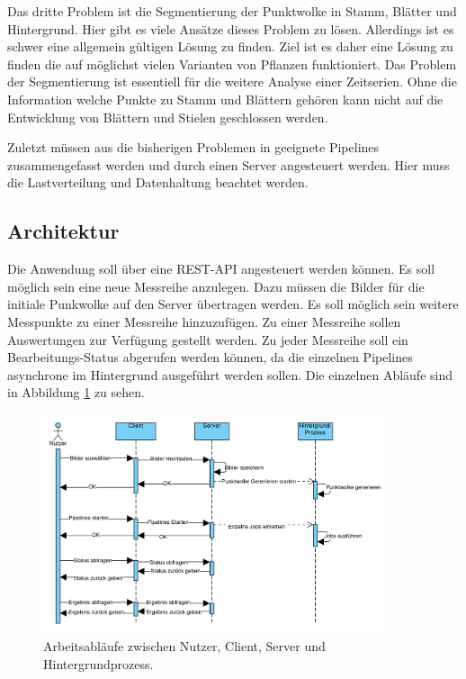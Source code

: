 \documentclass[12pt,titlepage, twoside]{article}
\begin{document}

Das dritte Problem ist die Segmentierung der Punktwolke in Stamm, Blätter und Hintergrund. Hier gibt es viele Ansätze dieses Problem zu lösen. Allerdings ist es schwer eine allgemein gültigen Lösung zu finden. 
Ziel ist es daher eine Lösung zu finden die auf möglichst vielen Varianten von Pflanzen funktioniert. 
Das Problem der Segmentierung ist essentiell für die weitere Analyse einer Zeitserien. Ohne die Information welche Punkte zu Stamm und Blättern gehören kann nicht auf die Entwicklung von Blättern und Stielen geschlossen werden.

Zuletzt müssen aus die bisherigen Problemen in geeignete Pipelines zusammengefasst werden und durch einen Server angesteuert werden. Hier muss die Lastverteilung und Datenhaltung beachtet werden.

\subsection{Architektur}
\label{sec:realisierung:architektur}

Die Anwendung soll über eine REST-API angesteuert werden können. Es soll möglich sein eine neue Messreihe anzulegen. Dazu müssen die Bilder für die initiale Punkwolke auf den Server übertragen werden. 
Es soll möglich sein weitere Messpunkte zu einer Messreihe hinzuzufügen. Zu einer Messreihe sollen Auswertungen zur Verfügung gestellt werden. 
Zu jeder Messreihe soll ein Bearbeitungs-Status abgerufen werden können, da die einzelnen Pipelines asynchrone im Hintergrund ausgeführt werden sollen.
Die einzelnen Abläufe sind in Abbildung \ref{fig:WorkflowClientServer} zu sehen.

\begin{figure}
    \centering
    \includegraphics[width=0.9\textwidth]{./Images/WorkflowClientServer.png}
    \caption{Arbeitsabläufe zwischen Nutzer, Client, Server und Hintergrundprozess.}
    \label{fig:WorkflowClientServer}
\end{figure}
\end{document}
